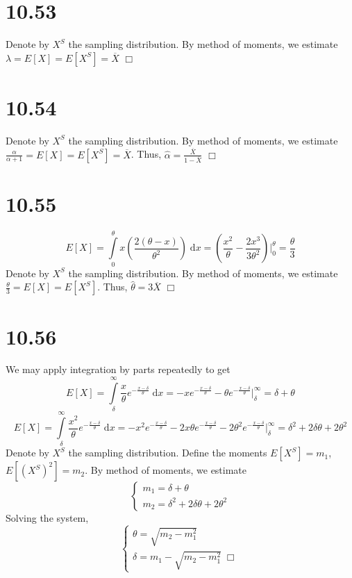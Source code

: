 \documentclass{article}
\begin{document}
\section*{10.53}
Denote by $X^S$ the sampling distribution. By method of moments, we estimate $\lambda = E[X] = E[X^S] = \overline{X}$ $\Box$

\section*{10.54}
Denote by $X^S$ the sampling distribution. By method of moments, we estimate $\frac{\alpha}{\alpha + 1} = E[X] = E[X^S] = \overline{X}$. Thus, $\hat{\alpha} = \frac{\overline{X}}{1-\overline{X}}$ $\Box$

\section*{10.55}
$$E[X] = \int\limits_0^\theta x\left(\frac{2(\theta - x)}{\theta^2} \right) \;\mathrm{d}x = \left(\frac{x^2}{\theta} - \frac{2x^3}{3\theta^2} \right)\Big\rvert_0^\theta = \frac{\theta}{3} $$
Denote by $X^S$ the sampling distribution. By method of moments, we estimate $\frac{\theta}{3} = E[X] = E[X^S]$. Thus, $\hat{\theta} = 3\overline{X}$ $\Box$

\section*{10.56}
We may apply integration by parts repeatedly to get
$$E[X] = \int\limits_\delta^\infty \frac{x}{\theta} e^{-\frac{x-\delta}{\theta}} \;\mathrm{d}x = -xe^{-\frac{x-\delta}{\theta}} - \theta e^{-\frac{x-\delta}{\theta}} \Big\rvert_\delta^\infty = \delta + \theta$$
$$E[X] = \int\limits_\delta^\infty \frac{x^2}{\theta} e^{-\frac{x-\delta}{\theta}} \;\mathrm{d}x = -x^2e^{-\frac{x-\delta}{\theta}} - 2x\theta e^{-\frac{x-\delta}{\theta}} -2\theta^2 e^{-\frac{x-\delta}{\theta}} \Big\rvert_\delta^\infty = \delta^2 + 2\delta\theta + 2\theta^2$$
Denote by $X^S$ the sampling distribution. Define the moments $E[X^S] = m_1$, $E[(X^S)^2] = m_2$. By method of moments, we estimate
\begin{equation*}
\begin{cases}
m_1 = \delta + \theta\\
m_2 = \delta^2 + 2\delta\theta + 2\theta^2
\end{cases}
\end{equation*}
Solving the system,
\begin{equation*}
\begin{cases}
\theta = \sqrt{m_2-m_1^2}\\
\delta = m_1 - \sqrt{m_2-m_1^2} \; \Box
\end{cases}
\end{equation*}
\end{document}
